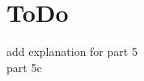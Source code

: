 \documentclass{article}
\begin{document}
	
	\newpage
	
	\section{ToDo}
	
	\begin{Large}
		add explanation for part 5\\
		
		part 5c\\
	\end{Large}
\end{document}
